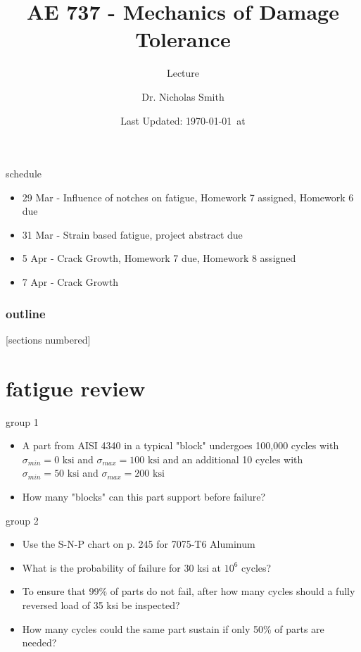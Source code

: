 \documentclass[10pt]{beamer}
\title{AE 737 - Mechanics of Damage Tolerance}
\subtitle{Lecture \arabic{lecture}}
\date{Last Updated: \today\ at \DTMcurrenttime}
\author{Dr. Nicholas Smith}
\institute{Wichita State University, Department of Aerospace Engineering}
\begin{document}
\maketitle
\begin{frame}{schedule}
	\begin{itemize}
		\item 29 Mar - Influence of notches on fatigue, Homework 7 assigned, Homework 6 due
		\item 31 Mar - Strain based fatigue, project abstract due
		\item 5 Apr - Crack Growth, Homework 7 due, Homework 8 assigned
		\item 7 Apr - Crack Growth
	\end{itemize}
\end{frame}

\begin{frame}
  \frametitle{outline}
  [sections numbered]
  \tableofcontents[hideallsubsections]
\end{frame}

\section{fatigue review}

\begin{frame}{group 1}
	\begin{itemize}
		\item A part from AISI 4340 in a typical "block" undergoes 100,000 cycles with $\sigma_{min} = 0 \text{ ksi}$ and $\sigma_{max} = 100 \text{ ksi}$ and an additional 10 cycles with $\sigma_{min} = 50 \text{ ksi}$ and $\sigma_{max} = 200 \text{ ksi}$
		\item How many "blocks" can this part support before failure?
	\end{itemize}
\end{frame}

\begin{frame}{group 2}
	\begin{itemize}
		\item Use the S-N-P chart on p. 245 for 7075-T6 Aluminum
		\item What is the probability of failure for 30 ksi at $10^6$ cycles?
		\item To ensure that 99\% of parts do not fail, after how many cycles should a fully reversed load of 35 ksi be inspected?
		\item How many cycles could the same part sustain if only 50\% of parts are needed?
	\end{itemize}
\end{frame}
\end{document}
